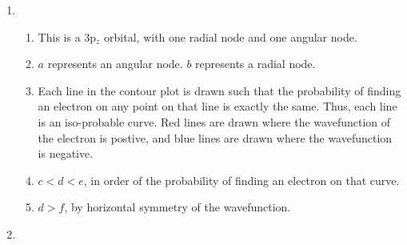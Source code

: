 \documentclass[10pt]{article}
\begin{document}
\begin{enumerate}
                \item
                \begin{enumerate}
                        \item This is a 3p$_z$ orbital, with one radial node and one angular node.
                        \item $a$ represents an angular node. $b$ represents a radial node.
                        \item Each line in the contour plot is drawn such that the probability of finding an electron on any point
                        on that line is exactly the same. Thus, each line is an iso-probable curve.
                        Red lines are drawn where the wavefunction of the electron is postive, and blue lines are drawn where the
                        wavefunction is negative.
                        \item $c < d < e$, in order of the probability of finding an electron on that curve.
                        \item $d > f$, by horizontal symmetry of the wavefunction.
                \end{enumerate}
                
                \item 
                
        \end{enumerate}
\end{document}
